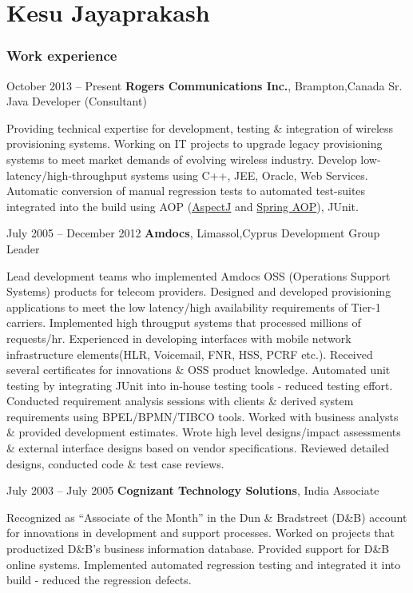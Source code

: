 \documentclass{tccv}
\begin{document}
\part{Kesu Jayaprakash}

\section{Work experience}

\begin{eventlist}

\item{October 2013 -- Present}
     {\textbf{Rogers Communications Inc.}, Brampton,Canada}
     {Sr. Java Developer (Consultant)}

Providing technical expertise for development, testing \& integration of wireless provisioning systems. Working on IT projects to upgrade legacy provisioning systems to meet market demands of evolving wireless industry. Develop low-latency/high-throughput systems using C++, JEE, Oracle, Web Services. Automatic conversion of manual regression tests to automated test-suites integrated into the build using AOP (\href{https://eclipse.org/aspectj/}{AspectJ} and \href{http://docs.spring.io/spring/docs/current/spring-framework-reference/html/aop.html}{Spring AOP}), JUnit.

\item{July 2005 -- December 2012}
     {\textbf{Amdocs}, Limassol,Cyprus}
     {Development Group Leader}

Lead development teams who implemented Amdocs OSS (Operations Support Systems) products for  telecom providers. Designed and developed provisioning applications to meet the low latency/high availability requirements of Tier-1 carriers. Implemented high througput systems that processed millions of requests/hr. Experienced in developing interfaces with mobile network infrastructure elements(HLR, Voicemail, FNR, HSS, PCRF etc.). Received several certificates for innovations \& OSS product knowledge. Automated unit testing by integrating JUnit into in-house testing tools - reduced testing effort. Conducted requirement analysis sessions with clients \& derived system requirements using BPEL/BPMN/TIBCO tools. Worked with business analysts \& provided development estimates. Wrote high level designs/impact assessments \& external interface designs based on vendor specifications. Reviewed detailed designs, conducted code \& test case reviews. 

\item{July 2003 -- July 2005}
     {\textbf{Cognizant Technology Solutions}, India}
     {Associate}

Recognized as ``Associate of the Month'' in the Dun \& Bradstreet (D\&B) account for innovations in development and support processes. Worked on projects that productized D\&B's business information database. Provided support for D\&B online systems. Implemented automated regression testing and integrated it into build - reduced the regression defects.


\end{eventlist}
\end{document}
